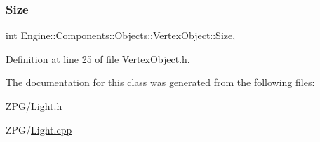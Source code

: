 \subsubsection{\texorpdfstring{Size}{Size}}
{\footnotesize\ttfamily int Engine\+::\+Components\+::\+Objects\+::\+Vertex\+Object\+::\+Size\hspace{0.3cm}{\ttfamily [protected]}, {\ttfamily [inherited]}}



Definition at line 25 of file Vertex\+Object.\+h.



The documentation for this class was generated from the following files\+:\begin{DoxyCompactItemize}
\item 
Z\+P\+G/\mbox{\hyperlink{Light_8h}{Light.\+h}}\item 
Z\+P\+G/\mbox{\hyperlink{Light_8cpp}{Light.\+cpp}}\end{DoxyCompactItemize}
